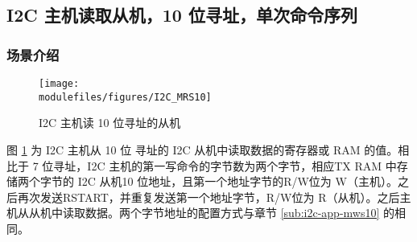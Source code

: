 \documentclass[main\_\_CN.tex]{subfiles}
\begin{document}
\subsection{I2C 主机读取从机，10 位寻址，单次命令序列}
\subsubsection{场景介绍}
\begin{figure}[H]
    \centering
    \texttt{[image: \\modulefiles/figures/I2C\_MRS10]}
    \caption{I2C 主机读 10 位寻址的从机}
    \label{fig:i2c-mrs10}
\end{figure}

图 \ref{fig:i2c-mrs10} 为 I2C 主机从 10 位 寻址的 I2C 从机中读取数据的寄存器或 RAM 的值。相比于 7 位寻址，I2C 主机的第一写命令的字节数为两个字节，相应TX RAM 中存储两个字节的 I2C 从机10 位地址，且第一个地址字节的R/W位为 W（主机）。之后再次发送RSTART，并重复发送第一个地址字节，R/W位为 R（从机）。之后主机从从机中读取数据。两个字节地址的配置方式与章节 \ref{sub:i2c-app-mws10} 的相同。
\end{document}
